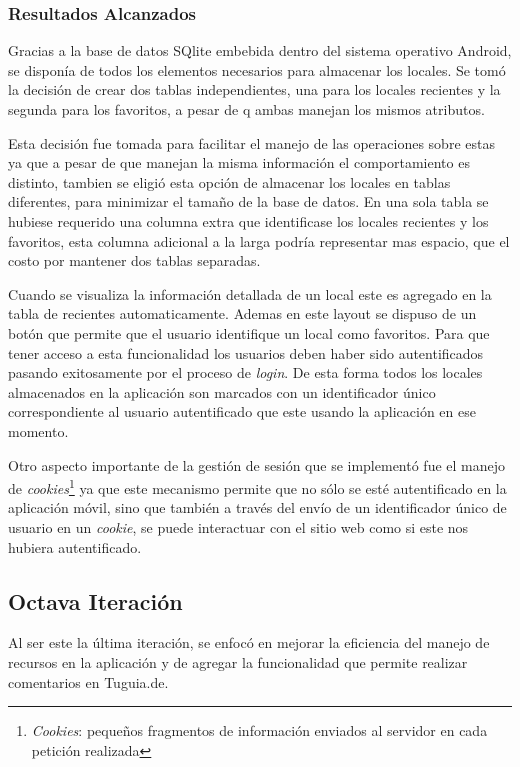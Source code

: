 \subsubsection{Resultados Alcanzados}

Gracias a la base de datos SQlite embebida dentro del sistema operativo Android, se disponía de todos los elementos necesarios para almacenar los locales. Se tomó la decisión de crear dos tablas independientes, una para los locales recientes y la segunda para los favoritos, a pesar de q ambas manejan los mismos atributos.

Esta decisión fue tomada para facilitar el manejo de las operaciones sobre estas ya que a pesar de que manejan la misma información el comportamiento es distinto, tambien se eligió esta opción de almacenar los locales en tablas diferentes, para minimizar el tamaño de la base de datos. En una sola tabla se hubiese requerido una columna extra que identificase los locales recientes y los favoritos, esta columna adicional a la larga podría representar mas espacio, que el costo por mantener dos tablas separadas.

Cuando se visualiza la información detallada de un local este es agregado en la tabla de recientes automaticamente. Ademas en este layout se dispuso de un botón que permite que el usuario identifique un local como favoritos. Para que tener acceso a esta funcionalidad los usuarios deben haber sido autentificados pasando exitosamente por el proceso de \textit{login}. De esta forma todos los locales almacenados en la aplicación son marcados con un identificador único correspondiente al usuario autentificado que este usando la aplicación en ese momento. 

Otro aspecto importante de la gestión de sesión que se implementó fue el manejo de \textit{cookies}\footnote{\textit{Cookies}: pequeños fragmentos de información enviados al servidor en cada petición realizada} ya que este mecanismo permite que no sólo se esté autentificado en la aplicación móvil, sino que también a través del envío de un identificador único de usuario en un \textit{cookie}, se puede interactuar con el sitio web como si este nos hubiera autentificado.

\subsection{Octava Iteración}

Al ser este la última iteración, se enfocó en mejorar la eficiencia del manejo de recursos en la aplicación y de agregar la funcionalidad que permite realizar comentarios en Tuguia.de.

